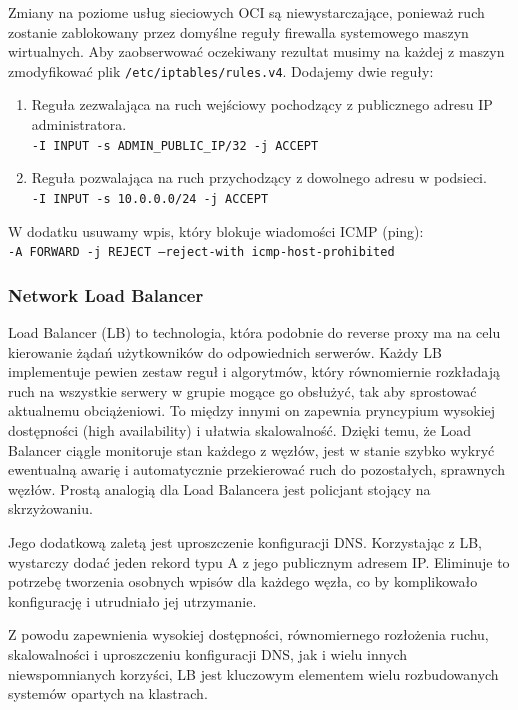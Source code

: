 Zmiany na poziome usług sieciowych OCI są niewystarczające, ponieważ ruch zostanie zablokowany przez domyślne reguły firewalla systemowego maszyn wirtualnych.
Aby zaobserwować oczekiwany rezultat musimy na każdej z maszyn zmodyfikować plik \texttt{/etc/iptables/rules.v4}. Dodajemy dwie reguły:
\begin{enumerate}
    \item Reguła zezwalająca na ruch wejściowy pochodzący z publicznego adresu IP administratora.\\
    \texttt{-I INPUT -s ADMIN_PUBLIC_IP/32 -j ACCEPT}
    \item Reguła pozwalająca na ruch przychodzący z dowolnego adresu w podsieci.\\
    \texttt{-I INPUT -s 10.0.0.0/24 -j ACCEPT}
\end{enumerate}

\noindent W dodatku usuwamy wpis, który blokuje wiadomości ICMP (ping):\\
\texttt{-A FORWARD -j REJECT --reject-with icmp-host-prohibited}

\subsubsection{Network Load Balancer}

Load Balancer (LB) to technologia, która podobnie do reverse proxy ma na celu kierowanie żądań użytkowników do odpowiednich serwerów.
Każdy LB implementuje pewien zestaw reguł i algorytmów, który równomiernie rozkładają ruch na wszystkie serwery w grupie mogące go obsłużyć, tak aby sprostować aktualnemu obciążeniowi.
To między innymi on zapewnia pryncypium wysokiej dostępności (high availability) i ułatwia skalowalność.
Dzięki temu, że Load Balancer ciągle monitoruje stan każdego z węzłów, jest w stanie szybko wykryć ewentualną awarię i automatycznie przekierować ruch do pozostałych, sprawnych węzłów.
Prostą analogią dla Load Balancera jest policjant stojący na skrzyżowaniu.

Jego dodatkową zaletą jest uproszczenie konfiguracji DNS. Korzystając z LB, wystarczy dodać jeden rekord typu A z jego publicznym adresem IP\@.
Eliminuje to potrzebę tworzenia osobnych wpisów dla każdego węzła, co by komplikowało konfigurację i utrudniało jej utrzymanie.

Z powodu zapewnienia wysokiej dostępności, równomiernego rozłożenia ruchu, skalowalności i uproszczeniu konfiguracji DNS, jak i wielu innych niewspomnianych korzyści, LB jest kluczowym elementem wielu rozbudowanych systemów opartych na klastrach.

